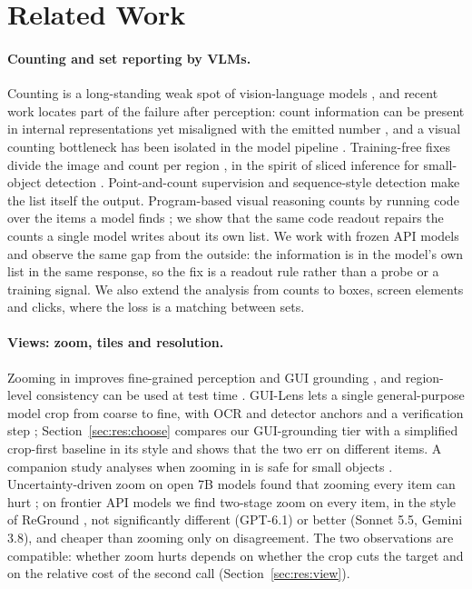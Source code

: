 \section{Related Work}\label{sec:related}

\paragraph{Counting and set reporting by VLMs.} Counting is a long-standing weak spot of vision-language models \citep{paiss2023countbench,rahmanzadehgervi2024blind}, and recent work locates part of the failure after perception: count information can be present in internal representations yet misaligned with the emitted number \citep{countmisaligned2026}, and a visual counting bottleneck has been isolated in the model pipeline \citep{countbottleneck2026}. Training-free fixes divide the image and count per region \citep{qharabagh2026lvlmcount}, in the spirit of sliced inference for small-object detection \citep{akyon2022sahi}. Point-and-count supervision \citep{deitke2025molmo} and sequence-style detection \citep{chen2022pix2seq,lmmdet2025} make the list itself the output. Program-based visual reasoning counts by running code over the items a model finds \citep{gupta2023visprog,suris2023vipergpt}; we show that the same code readout repairs the counts a single model writes about its own list. We work with frozen API models and observe the same gap from the outside: the information is in the model's own list in the same response, so the fix is a readout rule rather than a probe or a training signal. We also extend the analysis from counts to boxes, screen elements and clicks, where the loss is a matching between sets.

\paragraph{Views: zoom, tiles and resolution.} Zooming in improves fine-grained perception \citep{wu2024vstar,shen2024zoomeye,zhang2025mllmsknow} and GUI grounding \citep{zoomclick2025,uizoomer2026}, and region-level consistency can be used at test time \citep{du2025guirc}. GUI-Lens lets a single general-purpose model crop from coarse to fine, with OCR and detector anchors and a verification step \citep{fu2026guilens}; Section~\ref{sec:res:choose} compares our GUI-grounding tier with a simplified crop-first baseline in its style and shows that the two err on different items. A companion study analyses when zooming in is safe for small objects \citep{shi2026zoomin}. Uncertainty-driven zoom on open 7B models found that zooming every item can hurt \citep{uizoomer2026}; on frontier API models we find two-stage zoom on every item, in the style of ReGround \citep{li2025screenspotpro}, not significantly different (GPT-6.1) or better (Sonnet 5.5, Gemini 3.8), and cheaper than zooming only on disagreement. The two observations are compatible: whether zoom hurts depends on whether the crop cuts the target and on the relative cost of the second call (Section~\ref{sec:res:view}).

